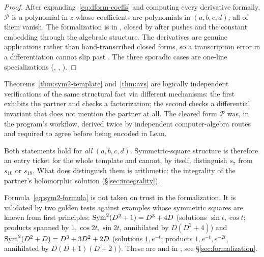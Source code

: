 \begin{proof}
After expanding~\eqref{eq:dform-coeffs} and computing every derivative
formally, $\mathcal{P}$ is a polynomial in $z$ whose coefficients are
polynomials in $(a,b,c,d)$; all of them vanish. The formalization is
 in
, closed by  after
 pushes  and the constant
embedding through the algebraic structure. The derivatives are genuine
 applications rather than hand-transcribed
closed forms, so a transcription error in a differentiation cannot slip past
. The three sporadic cases are one-line specializations
(, ,
).
\end{proof}

\begin{remark}
Theorems~\ref{thm:sym2-template} and~\ref{thm:avs} are logically independent
verifications of the same structural fact via different mechanisms: the first
exhibits the partner and checks a factorization; the second checks a
differential invariant that does not mention the partner at all. The cleared
form $\mathcal{P}$ was, in the program's workflow, derived twice by
independent computer-algebra routes and required to agree before being
encoded in Lean.
\end{remark}

\begin{remark}
Both statements hold for \emph{all} $(a,b,c,d)$. Symmetric-square structure is
therefore an entry ticket for the whole template and cannot, by itself,
distinguish $s_7$ from $s_{10}$ or $s_{18}$. What does distinguish them is
arithmetic: the integrality of the partner's holomorphic solution
(\S\ref{sec:integrality}).
\end{remark}

\begin{remark}
\label{rem:golden-sym2}
Formula~\eqref{eq:sym2-formula} is not taken on trust in the formalization. It
is validated by two golden tests against examples whose symmetric squares are
known from first principles: $\operatorname{Sym}^2(D^2+1) = D^3+4D$ (solutions
$\sin t,\cos t$; products spanned by $1,\cos 2t,\sin 2t$, annihilated by
$D(D^2+4)$) and $\operatorname{Sym}^2(D^2+D) = D^3+3D^2+2D$ (solutions $1,e^{-t}$; products
$1,e^{-t},e^{-2t}$, annihilated by $D(D+1)(D+2)$). These are
 and  in
; see \S\ref{sec:formalization}.
\end{remark}

